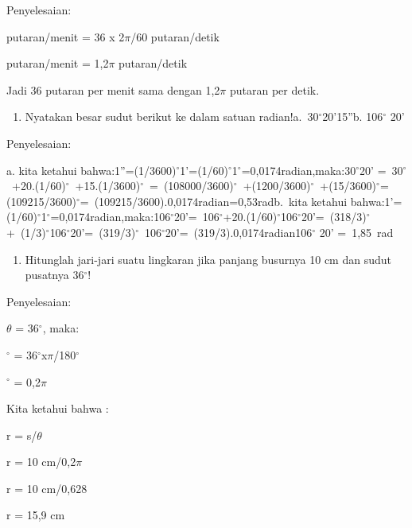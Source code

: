\documentclass[11pt,fleqn]{book} %
\begin{document}
\noindent 

\noindent Penyelesaian:

 putaran/menit = 36 x 2$\pi$/60 putaran/detik

 putaran/menit = 1,2$\pi$ putaran/detik

\noindent 

\noindent Jadi 36 putaran per menit sama dengan 1,2$\pi$ putaran per detik.

\noindent 

\begin{enumerate}
\item  Nyatakan besar sudut berikut ke dalam satuan radian!a.~30${}^\circ$20'15''b. 106${}^\circ$ 20'
\end{enumerate}

Penyelesaian:

\noindent a. kita ketahui bahwa:1''=(1/3600)${}^\circ$1'=(1/60)${}^\circ$1${}^\circ$=0,0174radian,maka:30${}^\circ$20' =~30${}^\circ$~+20.(1/60)${}^\circ$~+15.(1/3600)${}^\circ$~=~(108000/3600)${}^\circ$~+(1200/3600)${}^\circ$~+(15/3600)${}^\circ$=(109215/3600)${}^\circ$=~(109215/3600).0,0174radian=0,53radb.~kita ketahui bahwa:1'=(1/60)${}^\circ$1${}^\circ$=0,0174radian,maka:106${}^\circ$20'=~106${}^\circ$+20.(1/60)${}^\circ$106${}^\circ$20'=~(318/3)${}^\circ$+~(1/3)${}^\circ$106${}^\circ$20'=~(319/3)${}^\circ$~106${}^\circ$20'=~(319/3).0,0174radian106${}^\circ$ 20' =~1,85~rad

\noindent 

\begin{enumerate}
\item  Hitunglah jari-jari suatu lingkaran jika panjang busurnya 10 cm dan sudut pusatnya 36${}^\circ$!
\end{enumerate}

\noindent 

\noindent Penyelesaian:

\noindent $\theta$ = 36$\mathrm{{}^\circ}$, maka:

$\mathrm{{}^\circ}$ = 36$\mathrm{{}^\circ}$x$\pi$/180$\mathrm{{}^\circ}$

$\mathrm{{}^\circ}$ = 0,2$\pi$

\noindent Kita ketahui bahwa :

\noindent r = s/$\theta$

\noindent r = 10 cm/0,2$\pi$

\noindent r = 10 cm/0,628

\noindent r = 15,9 cm
\end{document}
